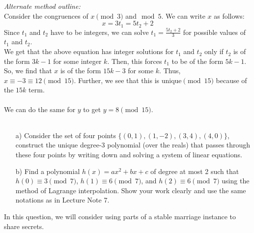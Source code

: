 \documentclass[]{article}
\newif\ifsolutions
\renewcommand{\answer}[1]{{\color{mydarkblue}\textbf{}#1}}
\begin{document}
\begin{qunlist}
{{\begin{enumerate}
      \textit{Alternate method outline:}\\
      Consider the congruences of $x\pmod 3$ and$\mod 5$. We can write $x$ as follows:
      $$x = 3t_1 = 5t_2 + 2$$
      Since $t_1$ and $t_2$ have to be integers, we can solve $t_1 = \frac{5t_2 + 2}{3}$ for possible values of $t_1$ and $t_2$.\\
      We get that the above equation has integer solutions for $t_1$ and $t_2$ only if $t_2$ is of the form $3k - 1$ for some integer $k$. Then, this forces $t_1$ to be of the form $5k-1$.\\
      So, we find that $x$ is of the form $15k-3$ for some $k$. Thus, $x \equiv -3 \equiv 12\pmod{15}$. Further, we see that this is unique$\pmod{15}$ because of the $15k$ term.\\\\
      We can do the same for $y$ to get $y = 8\pmod{15}$.\\\\
  \end{enumerate}
}}\fi


\begin{itemize}
\qpart
\item[a)] Consider the set of four points $\{(0,1),(1,-2),(3,4),(4,0)\}$,
construct the unique degree-3 polynomial (over the reals) that passes through these four points 
by writing down and solving a system of linear equations.

\ifsolutions{ \answer
{
\[
p(x) = (12-99x+76x^2-13x^3)/12
\]
}}\fi



\qpart
\item[b)] Find a polynomial $h(x)=ax^2 + bx + c$ of degree at most 2
such that $h(0) \equiv 3 \pmod 7$, $h(1) \equiv 6 \pmod 7$,
and $h(2) \equiv 6 \pmod 7$ using the method of Lagrange interpolation.
Show your work clearly and use the same notations as in Lecture Note 7.

\ifsolutions{ \answer
{
\[
 h(x) = 2 x^2 + x + 3 (mod 7)
\]
}}\fi

\end{itemize}




\qpart


\qpart




In this question, we will consider using parts of a stable marriage instance to share secrets. 


\end{qunlist}
\end{document}
